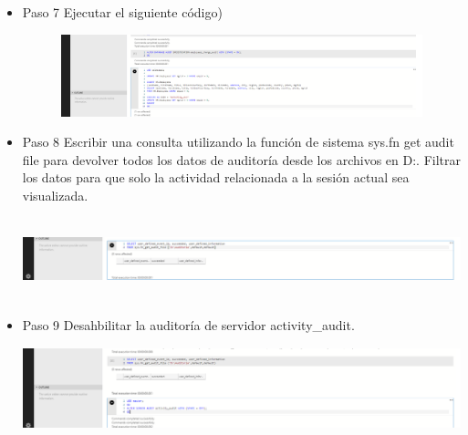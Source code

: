 \begin{itemize}
   				    \item Paso 7 Ejecutar el siguiente código)
				 
				 \begin{center}
    				\includegraphics[width=16cm, height=90]{./Imagenes/Imagen7}
   				    \end{center}   
   				    \clearpage
   				    \item Paso 8 Escribir una consulta utilizando la función de sistema sys.fn get audit file para devolver todos los datos de auditoría desde los archivos en D:\Auditoria. Filtrar los datos para que solo la actividad relacionada a la sesión actual sea visualizada.
				 
				 \begin{center}
    				\includegraphics[width=16cm, height=90]{./Imagenes/Imagen8}
   				    \end{center}   
   				    \clearpage	
   				    \item Paso 9 Desahbilitar la auditoría de servidor activity_audit.
				 
				 \begin{center}
    				\includegraphics[width=16cm, height=90]{./Imagenes/Imagen9}
   				    \end{center} 	
   				    
   				      
				  
				 				  
				   \end{itemize}
				   \clearpage



\\\\




